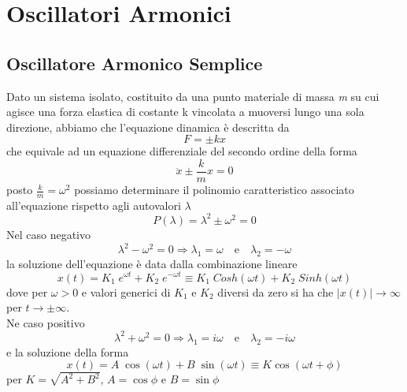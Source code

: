 \section{Oscillatori Armonici}

\subsection{Oscillatore Armonico Semplice}

Dato un sistema isolato, costituito da una punto materiale di massa \textit{m} su cui agisce una forza elastica di costante k vincolata a muoversi lungo una sola direzione, abbiamo che l'equazione dinamica \`{e} descritta da 
\begin{equation*}
	F = \pm kx 
\end{equation*}
che equivale ad un equazione differenziale del secondo ordine della forma 
\begin{equation}
	\ddot{x} \pm \frac{k}{m}x = 0
\end{equation}
posto $\frac{k}{m} = \omega^2$ possiamo determinare il polinomio caratteristico associato all'equazione rispetto agli autovalori $\lambda$
\begin{equation}
	P(\lambda) = \lambda^2 \pm \omega^2 = 0
\end{equation}
Nel caso negativo 
\begin{equation*}
	\lambda^2 - \omega^2 = 0 \Rightarrow \lambda_{1} = \omega \quad \text{e} \quad \lambda_2 = - \omega 
\end{equation*}
la soluzione dell'equazione \`{e} data dalla combinazione lineare
\begin{equation}
	x(t) = K_1 \;e^{\omega t} + K_2 \; e^{-\omega t} \equiv K_1 \; Cosh(\omega t) + K_2 \; Sinh(\omega t)
\end{equation}
dove per $\omega > 0 $ e valori generici di $K_1$ e $K_2$ diversi da zero si ha che $|x(t)| \rightarrow \infty$ per $t \rightarrow \pm \infty $.\newline
\\
Ne caso positivo 
\begin{equation*}
	\lambda^2 + \omega^2 = 0 \Rightarrow \lambda_{1} = i\omega \quad \text{e} \quad \lambda_2 = -i\omega 
\end{equation*}
e la soluzione della forma 
\begin{equation}
	x(t) = A \; \cos(\omega t) + B \; \sin(\omega t) \equiv K \cos(\omega t + \phi)
\end{equation}
per $K = \sqrt{A^2 + B^2}$, $A = \cos{\phi}$ e $B = \sin \phi$


